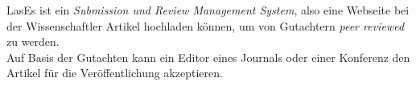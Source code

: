
LasEs ist ein \emph{Submission und Review Management System}, also eine Webseite bei der Wissenschaftler Artikel hochladen können, um von Gutachtern \emph{peer reviewed} zu werden.\\
Auf Basis der Gutachten kann ein Editor eines Journals oder einer Konferenz den Artikel für die Veröffentlichung akzeptieren.
